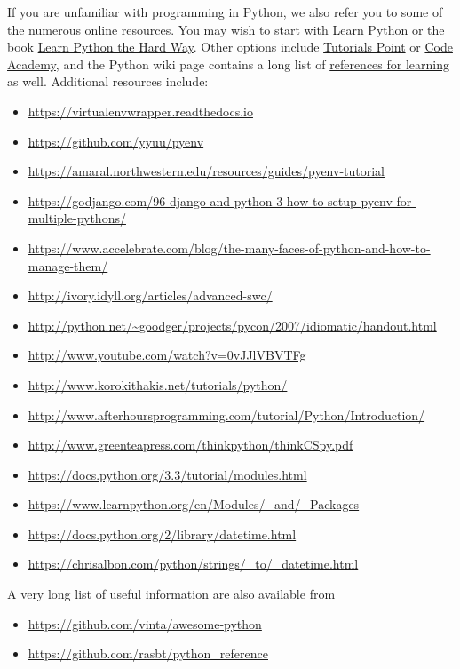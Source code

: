 If you are unfamiliar with programming in Python, we also refer you to
some of the numerous online resources. You may wish to start with
\href{https://www.learnpython.org}{Learn Python} or the book
\href{http://learnpythonthehardway.org/book/}{Learn Python the Hard
Way}. Other options include
\href{http://www.tutorialspoint.com/python/}{Tutorials Point} or
\href{http://www.codecademy.com/en/tracks/python}{Code Academy}, and the
Python wiki page contains a long list of
\href{https://wiki.python.org/moin/BeginnersGuide/Programmers}{references
for learning} as well. Additional resources include:

\begin{itemize}
\item
  \url{https://virtualenvwrapper.readthedocs.io}
\item
  \url{https://github.com/yyuu/pyenv}
\item
  \url{https://amaral.northwestern.edu/resources/guides/pyenv-tutorial}
\item
  \url{https://godjango.com/96-django-and-python-3-how-to-setup-pyenv-for-multiple-pythons/}
\item
  \url{https://www.accelebrate.com/blog/the-many-faces-of-python-and-how-to-manage-them/}
\item
  \url{http://ivory.idyll.org/articles/advanced-swc/}
\item
  \url{http://python.net/~goodger/projects/pycon/2007/idiomatic/handout.html}
\item
  \url{http://www.youtube.com/watch?v=0vJJlVBVTFg}
\item
  \url{http://www.korokithakis.net/tutorials/python/}
\item
  \url{http://www.afterhoursprogramming.com/tutorial/Python/Introduction/}
\item
  \url{http://www.greenteapress.com/thinkpython/thinkCSpy.pdf}
\item
  \url{https://docs.python.org/3.3/tutorial/modules.html}
\item
  \url{https://www.learnpython.org/en/Modules/_and/_Packages}
\item
  \url{https://docs.python.org/2/library/datetime.html}
\item
  \url{https://chrisalbon.com/python/strings/_to/_datetime.html}
\end{itemize}

A very long list of useful information are also available from

\begin{itemize}
\item
  \url{https://github.com/vinta/awesome-python}
\item
  \url{https://github.com/rasbt/python_reference}
\end{itemize}

